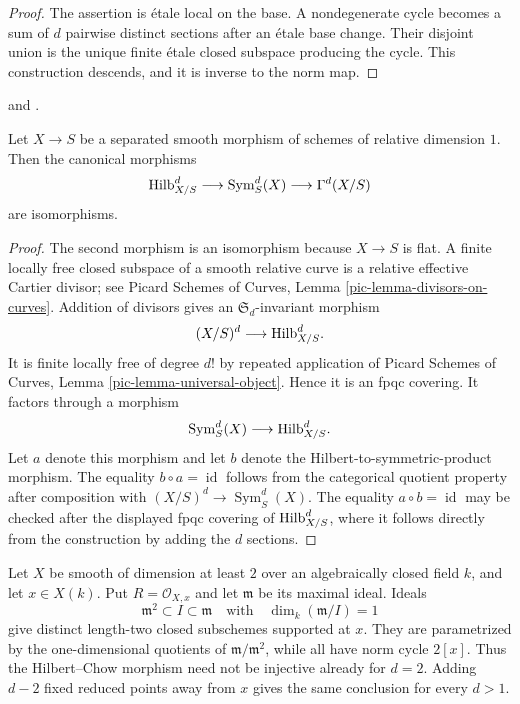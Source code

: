 \begin{proof}
The assertion is \'etale local on the base. A nondegenerate cycle becomes a
sum of $d$ pairwise distinct sections after an \'etale base change. Their
disjoint union is the unique finite \'etale closed subspace producing the
cycle. This construction descends, and it is inverse to the norm map.
\end{proof}

\begin{proposition}
\label{proposition-hilbert-chow-smooth-curves}
\begin{reference}
\cite[Expos\'e 221, Section 6(b)]{FGA} and
\cite[Section 6]{Rydh-zero-cycles-II}.
\end{reference}
Let $X \to S$ be a separated smooth morphism of schemes of relative
dimension $1$.
Then the canonical morphisms
$$
\mathrm{Hilb}^d_{X/S}
\longrightarrow \operatorname{Sym}^d_S(X)
\longrightarrow \Gamma^d(X/S)
$$
are isomorphisms.
\end{proposition}

\begin{proof}
The second morphism is an isomorphism because $X \to S$ is flat. A finite
locally free closed subspace of a smooth relative curve is a relative
effective Cartier divisor; see Picard Schemes of Curves, Lemma
\ref{pic-lemma-divisors-on-curves}. Addition of divisors gives an
$\mathfrak S_d$-invariant morphism
$$
(X/S)^d \longrightarrow \mathrm{Hilb}^d_{X/S}.
$$
It is finite locally free of degree $d!$ by repeated application of Picard
Schemes of Curves, Lemma \ref{pic-lemma-universal-object}. Hence it is an
fpqc covering. It factors through a morphism
$$
\operatorname{Sym}^d_S(X) \longrightarrow \mathrm{Hilb}^d_{X/S}.
$$
Let $a$ denote this morphism and let $b$ denote the
Hilbert-to-symmetric-product morphism. The equality
$b \circ a = \operatorname{id}$ follows from the categorical quotient
property after composition with $(X/S)^d \to \operatorname{Sym}^d_S(X)$.
The equality $a \circ b = \operatorname{id}$ may be checked after the
displayed fpqc covering of $\mathrm{Hilb}^d_{X/S}$, where it follows
directly from the construction by adding the $d$ sections.
\end{proof}

\begin{example}
\label{example-hilbert-chow-not-injective}
Let $X$ be smooth of dimension at least $2$ over an algebraically closed
field $k$, and let $x \in X(k)$. Put
$R = \mathcal{O}_{X,x}$ and let $\mathfrak m$ be its maximal ideal. Ideals
$$
\mathfrak m^2 \subset I \subset \mathfrak m
\quad\text{with}\quad
\dim_k(\mathfrak m/I) = 1
$$
give distinct length-two closed subschemes supported at $x$. They are
parametrized by the one-dimensional quotients of
$\mathfrak m/\mathfrak m^2$, while all have norm cycle $2[x]$. Thus the
Hilbert--Chow morphism need not be injective already for $d = 2$. Adding
$d - 2$ fixed reduced points away from $x$ gives the same conclusion for
every $d > 1$.
\end{example}





